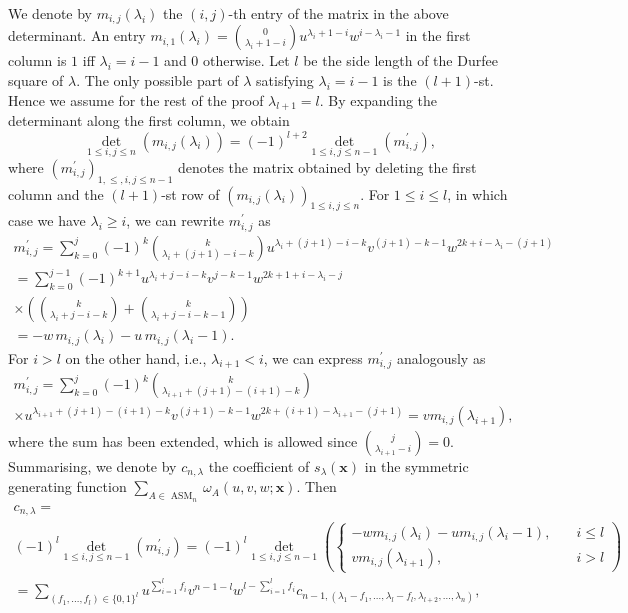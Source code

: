 \documentclass[11pt]{article}
\theoremstyle{definition}
\numberwithin{equation}{section}
\newcommand{\x}{\mathbf{x}}
\DeclareMathOperator{\ASM}{ASM}
\newcounter{x}
\newcounter{y}
\begin{document}
We denote by $m_{i,j}(\lambda_i)$ the $(i,j)$-th entry of the matrix in the above determinant. An entry $m_{i,1}(\lambda_i)= \binom{0}{\lambda_i+1-i}u^{\lambda_i+1-i} w^{i-\lambda_i-1} $ in the first column is $1$ iff $\lambda_i=i-1$ and $0$ otherwise. Let $l$ be the side length of the Durfee square of $\lambda$. The only possible part of $\lambda$ satisfying $\lambda_i=i-1$ is the $(l+1)$-st. Hence we assume for the rest of the proof $\lambda_{l+1}=l$. By expanding the determinant along the first column, we obtain
\[
\det_{1 \leq i,j \leq n} \left(m_{i,j}(\lambda_i) \right) = (-1)^{l+2}\det_{1 \leq i,j \leq n-1} \left(m_{i,j}^\prime \right),
\]
where $(m_{i,j}^\prime)_{1,\leq,i,j \leq n-1}$ denotes the matrix obtained by deleting the first column and the $(l+1)$-st row of $(m_{i,j}(\lambda_i))_{1\leq i,j \leq n}$. For $1 \leq i \leq l$, in which case we have $\lambda_{i}\geq i$, we can rewrite $m_{i,j}^\prime$ as
\begin{multline*}
m_{i,j}^\prime =
\sum_{k=0}^{j} (-1)^k \binom{k}{\lambda_i+(j+1)-i-k}  u^{\lambda_i+(j+1)-i-k} v^{(j+1)-k-1} w^{2k+i-\lambda_i-(j+1)} \\
= \sum_{k=0}^{j-1} (-1)^{k+1}    u^{\lambda_i+j-i-k}v^{j-k-1} w^{2k+1+i-\lambda_i-j} \\
\times
 \left( \binom{k}{\lambda_i+j-i-k}+ \binom{k}{\lambda_i+j-i-k-1} \right) \\
 = -w \, m_{i,j}(\lambda_i) - u \, m_{i,j}(\lambda_i-1).
\end{multline*}
For $i>l$ on the other hand, i.e., $\lambda_{i+1}<i$, we can express $m_{i,j}^\prime$ analogously as
\begin{multline*}
m_{i,j}^\prime = \sum_{k=0}^{j} (-1)^{k}\binom{k}{\lambda_{i+1}+(j+1)-(i+1)-k} \\
\times  u^{\lambda_{i+1}+(j+1)-(i+1)-k} v^{(j+1)-k-1} w^{2k+(i+1)-\lambda_{i+1}-(j+1)}
=  v m_{i,j}(\lambda_{i+1}),
\end{multline*}
where the sum has been extended, which is allowed since $\binom{j}{\lambda_{i+1}-i}=0$.
Summarising, we denote by $c_{n,\lambda}$ the coefficient of $s_\lambda(\mathbf{x})$ in the symmetric generating function $\sum_{A \in \ASM_n}\omega_A(u,v,w;\x)$. Then
\begin{multline*}
c_{n,\lambda} =\\
 (-1)^{l}\det_{1 \leq i,j \leq n-1} \left(m_{i,j}^\prime \right) 
 = (-1)^{l}\det_{1 \leq i,j \leq n-1} \left( 
\begin{cases}
-w m_{i,j}(\lambda_i)- u m_{i,j}(\lambda_i-1), \quad & i \leq l\\
 v m_{i,j}(\lambda_{i+1}), & i>l
\end{cases} \right) \\
= \sum_{(f_1,\ldots,f_l) \in \{0,1\}^l} u^{\sum_{i=1}^l f_i}  v^{n-1-l} w^{l-\sum_{i=1}^l f_i}
  c_{n-1,(\lambda_1 -f_1,\ldots,\lambda_l-f_l,\lambda_{l+2},\ldots,\lambda_n)},
\end{multline*}
\end{document}
